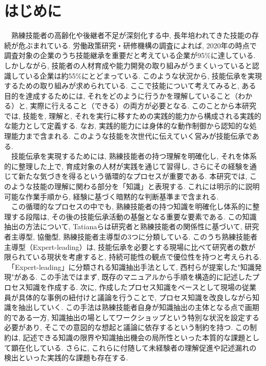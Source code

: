 \chapter{はじめに}
　熟練技能者の高齢化や後継者不足が深刻化する中, 長年培われてきた技能の存続が危ぶまれている. 労働政策研究・研修機構の調査によれば, 2020年の時点で調査対象の企業のうち技能継承を重要だと考えている企業が95\%に達している. しかしながら, 技能者の人材育成や能力開発の取り組みがうまくいっていると認識している企業は約55\%にとどまっている\cite{JILPT2020}. このような状況から, 技能伝承を実現するための取り組みが求められている. ここで技能について考えてみると, ある目的を達成するためには, それをどのように行うかを理解していること（わかる）と, 実際に行えること（できる）の両方が必要となる. このことから本研究では, 技能を, 理解と, それを実行に移すための実践的能力から構成される実践的な能力として定義する. なお, 実践的能力には身体的な動作制御から認知的な処理能力まで含まれる. このような技能を次世代に伝えていく営みが技能伝承である.\\
　技能伝承を実現するためには, 熟練技能者の持つ理解を明確化し, それを体系的に整理した上で, 育成対象の人材が実践を通じて習得し, さらにその経験を通じて新たな気づきを得るという循環的なプロセスが重要である. 本研究では, このような技能の理解に関わる部分を「知識」と表現する. これには明示的に説明可能な作業手順から, 経験に基づく暗黙的な判断基準まで含まれる.\\
　この循環的なプロセスの中でも, 熟練技能者の持つ知識を明確化し体系的に整理する段階は, その後の技能伝承活動の基盤となる重要な要素である. この知識抽出の方法について, Tatianaらは研究者と熟練技能者の関係性に基づいて, 研究者主導型, 協働型, 熟練技能者主導型の3つに分類している\cite{Tatiana2012}. このうち熟練技能者主導型（Expert-leading）は, 技能伝承を必要とする現場に比べて研究者の数が限られている現状を考慮すると, 持続可能性の観点で優位性を持つと考えられる.\\
　「Expert-leading」に分類される知識抽出手法として, 西村らが提案した"知識発現"\cite{Nishimura2017}がある. この手法ではまず, 既存のマニュアルから手順を構造的に記述したプロセス知識を作成する. 次に, 作成したプロセス知識をベースとして現場の従業員が具体的な事例の紐付けと議論を行うことで, プロセス知識を改良しながら知識を抽出していく. この手法は熟練技能者自身が知識抽出の主体となる点で画期的である一方, 知識抽出の場としてワークショップという特別な状況を設定する必要があり, そこでの意図的な想起と議論に依存するという制約を持つ. この制約は, 記述できる知識の限界や知識抽出機会の局所性といった本質的な課題として顕在化している. さらに, これらに付随して未経験者の理解促進や記述漏れの検出といった実践的な課題も存在する.\\
